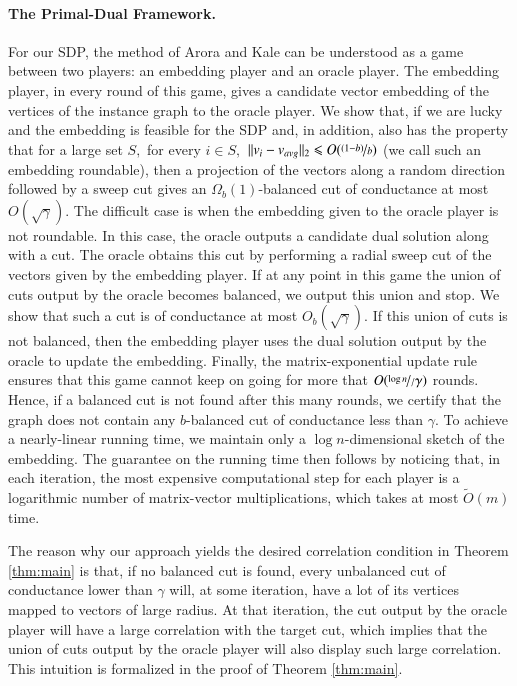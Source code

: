 \documentclass[twoside,leqno,twocolumn]{article}
\newcommand{\nfrac}{\nicefrac}
\renewcommand{\leq}{\leqslant}
\newcommand{\SDP}{{\sf SDP}\xspace}
\numberwithin{equation}{section}
\begin{document}
\paragraph{The Primal-Dual Framework.}
For our {\SDP}, the method of Arora and Kale can be understood as a game between two players: an embedding player and an  oracle player. The embedding player, in every round of this game, gives a candidate vector embedding of the vertices of the instance graph to the oracle player. We show that, if we are lucky and  the embedding is feasible for the {\SDP} and, in addition, also has the property that for a large set $S,$ for every $i \in S,$ $\|v_{i}-v_{avg}\|_{2} \leq O(\nfrac{(1-b)}{b})$  (we call such an embedding roundable), then a projection of the vectors along a random direction followed by a  sweep cut  gives an $\Omega_{b}(1)$-balanced cut of conductance at most $O(\sqrt{\gamma}).$ The  difficult case is when the embedding given to the oracle player is not roundable. In this case, the oracle outputs a candidate dual solution along with a cut. The oracle obtains this  cut  by performing a radial sweep cut of the vectors given by the embedding player.  If at any point in this game the union of cuts output by the oracle becomes balanced, we output this union and stop. We show that such a cut is of conductance at most $O_b(\sqrt{\gamma}).$  If this union of cuts is not balanced, then the embedding player uses the dual solution output by the oracle to update the embedding.
Finally, the matrix-exponential update rule ensures that this game cannot keep on going  for more that $O(\nfrac{\log n}/{\gamma})$ rounds. Hence, if a balanced cut is not found after this many rounds, we certify that the graph does not contain any $b$-balanced cut of conductance less than $\gamma.$  
To achieve a nearly-linear running time, we  maintain only  a $\log n$-dimensional sketch of the embedding.  The guarantee on the running time then follows by noticing that,  in each iteration,  the most expensive computational step for each player is a logarithmic number of matrix-vector multiplications, which takes at most $\tilde{O}(m)$ time. 

The reason why our approach yields the desired correlation condition in Theorem \ref{thm:main} is that, if no balanced cut is found, every unbalanced cut of conductance lower than $\gamma$ will, at some iteration, have a lot of its vertices mapped to vectors of large radius. At that iteration, the cut output by the oracle player will have a large correlation with the target cut, which implies that the union of cuts output by the oracle player will also display such large correlation. This intuition is formalized in the proof of Theorem \ref{thm:main}.
\end{document}
